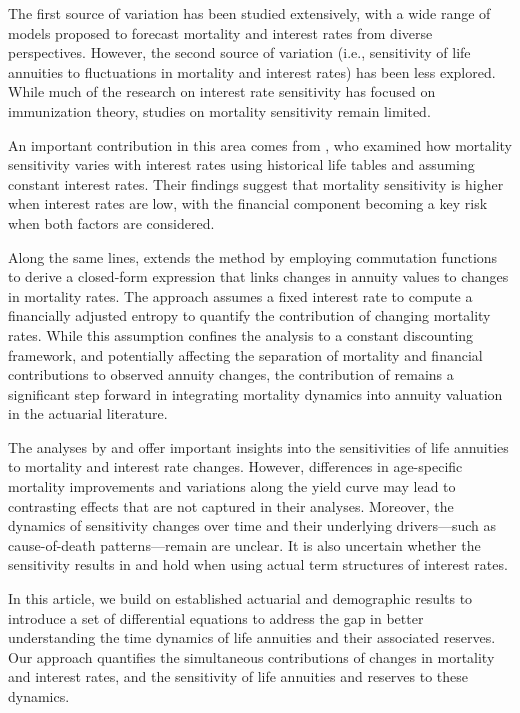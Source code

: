 \documentclass[12pt]{article}
\begin{document}
The first source of variation has been studied extensively, with a wide range of models proposed to forecast mortality and interest rates from diverse perspectives. However, the second source of variation (i.e., sensitivity of life annuities to fluctuations in mortality and interest rates) has been less explored. While much of the research on interest rate sensitivity has focused on immunization theory, studies on mortality sensitivity remain limited.

An important contribution in this area comes from \citet{rabitti2020mortality}, who examined how mortality sensitivity varies with interest rates using historical life tables and assuming constant interest rates. Their findings suggest that mortality sensitivity is higher when interest rates are low, with the financial component becoming a key risk when both factors are considered. 
 
Along the same lines, \citet{di2025decomposing} extends the \citet{Vaupel2003} method by employing commutation functions to derive a closed-form expression that links changes in annuity values to changes in mortality rates. The approach assumes a fixed interest rate to compute a financially adjusted entropy to quantify the contribution of changing mortality rates. While this assumption confines the analysis to a constant discounting framework, and potentially affecting the separation of mortality and financial contributions to observed annuity changes, the contribution of \citet{di2025decomposing} remains a significant step forward in integrating mortality dynamics into annuity valuation in the actuarial literature.
 
The analyses by \citet{rabitti2020mortality} and \citet{di2025decomposing} offer important insights into the sensitivities of life annuities to mortality and interest rate changes. However, differences in age-specific mortality improvements and variations along the yield curve may lead to contrasting effects that are not captured in their analyses. Moreover, the dynamics of sensitivity changes over time and their underlying drivers—such as cause-of-death patterns—remain are unclear. It is also uncertain whether the sensitivity results in \citet{rabitti2020mortality} and \citet{di2025decomposing} hold when using actual term structures of interest rates.
 

In this article, we build on established actuarial and demographic results to introduce a set of differential equations to address the gap in better understanding the time dynamics of life annuities and their associated reserves. Our approach quantifies the simultaneous contributions of changes in mortality and interest rates, and the sensitivity of life annuities and reserves to these dynamics.
\end{document}
